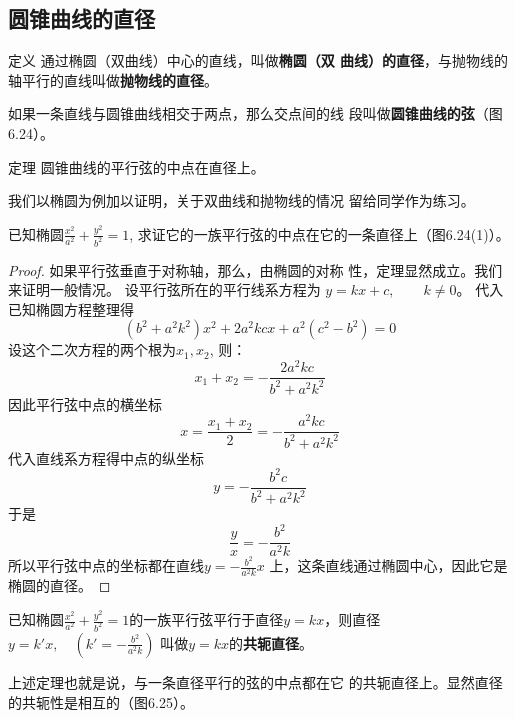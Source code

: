 \subsection{圆锥曲线的直径}
\begin{blk}
  {定义} 通过椭圆（双曲线）中心的直线，叫做\textbf{椭圆（双
曲线）的直径}，与抛物线的轴平行的直线叫做\textbf{抛物线的直径}。

如果一条直线与圆锥曲线相交于两点，那么交点间的线
段叫做\textbf{圆锥曲线的弦}（图6.24）。  
\end{blk}

\begin{figure}[htp]
    \centering

    \caption{}
\end{figure}


\begin{blk}
  {定理} 圆锥曲线的平行弦的中点在直径上。
\end{blk}

我们以椭圆为例加以证明，关于双曲线和抛物线的情况
留给同学作为练习。

已知椭圆$\frac{x^2}{a^2}+\frac{y^2}{b^2}=1$, 求证它的一族平行弦的中点在它的一条直径上（图6.24(1)）。

\begin{proof}
    如果平行弦垂直于对称轴，那么，由椭圆的对称
性，定理显然成立。我们来证明一般情况。
设平行弦所在的平行线系方程为
$y=kx+c,\qquad k\ne 0$。
代入已知椭圆方程整理得
\[(b^2+a^2k^2)x^2+2a^2kcx+a^2(c^2-b^2)=0\]
设这个二次方程的两个根为$x_1,x_2$, 则：
\[x_1+x_2=-\frac{2a^2kc}{b^2+a^2k^2}\]
因此平行弦中点的横坐标
\[x=\frac{x_1+x_2}{2}=-\frac{a^2kc}{b^2+a^2k^2}\]
代入直线系方程得中点的纵坐标
\[y=-\frac{b^2c}{b^2+a^2k^2}\]
于是
\[\frac{y}{x}=-\frac{b^2}{a^2k}\]
所以平行弦中点的坐标都在直线$y=-\frac{b^2}{a^2k}x$
上，这条直线通过椭圆中心，因此它是椭圆的直径。
\end{proof}

已知椭圆$\frac{x^2}{a^2}+\frac{y^2}{b^2}=1$的一族平行弦平行于直径$y=kx$，则直径$y=k'x,\quad \left(k'=-\frac{b^2}{a^2k}\right)$
叫做$y=kx$的\textbf{共轭直径}。

上述定理也就是说，与一条直径平行的弦的中点都在它
的共轭直径上。显然直径的共轭性是相互的（图6.25）。

\begin{figure}[htp]\centering
    \begin{minipage}[t]{0.48\textwidth}
    \centering
\begin{tikzpicture}[>=latex, scale=1]
       
    \end{tikzpicture}
    \caption{}
    \end{minipage}
    \begin{minipage}[t]{0.48\textwidth}
    \centering
    \begin{tikzpicture}[>=latex, scale=1]
      
    \end{tikzpicture}
    \caption{}
    \end{minipage}
    \end{figure}

